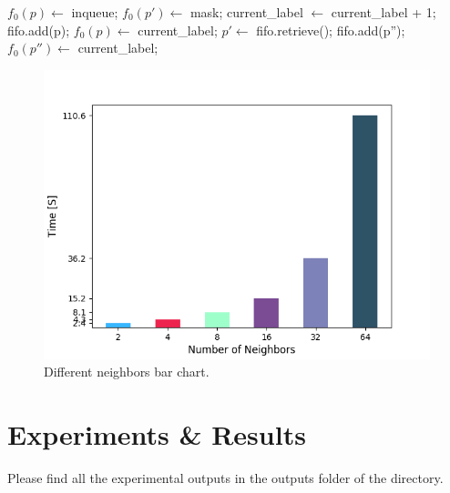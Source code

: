 \documentclass{article}
\begin{document}
\begin{algorithm}[H]
\begin{algorithmic}[1]
            \State $f_{0}(p) \gets$ inqueue;
            \State $f_{0}(p') \gets$ mask;
        \EndIf
    \EndFor
            \State current\_label $\gets$ current\_label + 1;
            \State fifo.add(p);
            \State $f_{0}(p) \gets $ current\_label;
                \State $p' \gets$ fifo.retrieve();
                        \State fifo.add(p'');
                        \State $f_{0}(p'') \gets$ current\_label;
                    \EndIf
                \EndFor
            \EndWhile
        \EndIf
    \EndFor    
\EndWhile
\EndProcedure
\end{algorithmic}
\end{algorithm}

\begin{figure}[H]
    \centering
    \includegraphics[width=\linewidth]{neighbor-chartbar.png}
    \caption{Different neighbors bar chart.}
    \label{fig:neighbor-chartbar}
\end{figure}

\section{Experiments \& Results}
Please find all the experimental outputs in the outputs folder of the directory.
\end{document}
